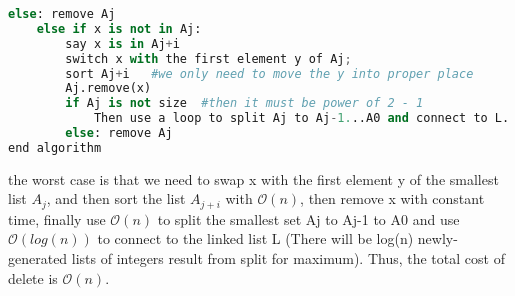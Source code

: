\documentclass[10pt]{article}
\begin{document}
\begin{itemize}
\begin{lstlisting}[language=Python]
		else: remove Aj
	else if x is not in Aj:
		say x is in Aj+i
		switch x with the first element y of Aj;
		sort Aj+i   #we only need to move the y into proper place
		Aj.remove(x)
		if Aj is not size  #then it must be power of 2 - 1
			Then use a loop to split Aj to Aj-1...A0 and connect to L.
		else: remove Aj
end algorithm
\end{lstlisting}
the worst case is that we need to swap x with the first element y of the smallest list $A_j$, and then sort the list $A_{j+i}$ with $\mathcal{O}(n)$, then remove x with constant time, finally use $\mathcal{O}(n)$ to split the smallest set  Aj to Aj-1 to A0 and use $\mathcal{O}(log(n))$ to connect to the linked list L (There will be log(n) newly-generated lists of integers result from split for maximum). Thus, the total cost of delete is $\mathcal{O}(n)$.
\end{itemize}
\end{document}
